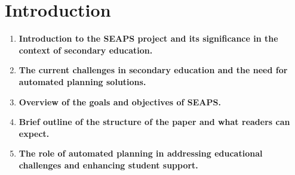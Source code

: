 \section{Introduction}
\begin{enumerate}
    \item \textbf{Introduction to the SEAPS project and its significance in the context of secondary education.}
    \item \textbf{The current challenges in secondary education and the need for automated planning solutions.}
    \item \textbf{Overview of the goals and objectives of SEAPS.}
    \item \textbf{Brief outline of the structure of the paper and what readers can expect.}
    \item \textbf{The role of automated planning in addressing educational challenges and enhancing student support.}
\end{enumerate}